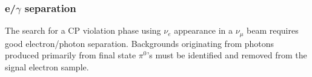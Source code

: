 %


\subsubsection{e/$\gamma$ separation}
\label{sec_egam}

The search for a CP violation phase using $\nu_e$ appearance 
in a $\nu_\mu$ beam requires good electron/photon separation.
Backgrounds originating from photons produced primarily from 
final state $\pi^0$'s must be identified and removed from the signal
electron sample. 


